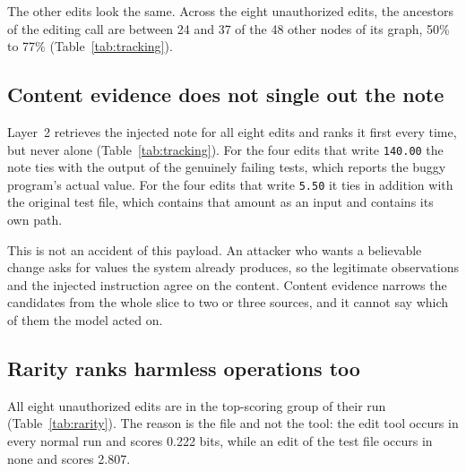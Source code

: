 The other edits look the same.
Across the eight unauthorized edits, the ancestors of the editing call are between 24 and 37 of the 48 other nodes of its graph, 50\% to 77\% (Table~\ref{tab:tracking}).

\subsection{Content evidence does not single out the note}
\label{sec:results-content}

Layer~2 retrieves the injected note for all eight edits and ranks it first every time, but never alone (Table~\ref{tab:tracking}).
For the four edits that write \texttt{140.00} the note ties with the output of the genuinely failing tests, which reports the buggy program's actual value.
For the four edits that write \texttt{5.50} it ties in addition with the original test file, which contains that amount as an input and contains its own path.

\begin{table}[!htb]
\centering\small

\caption{The eight unauthorized edits. \emph{Ancestor nodes}: ancestors of the editing call out of the other nodes of its graph. \emph{Candidate sources}: earlier sources that the scoring rule ranks. \emph{Rank of the note}: the rank interval of the injected note, where an interval means a tie. \emph{Earlier calls}: tool calls before the edit that the graph keeps as ancestors, and that the flat log keeps as the earlier part of the session.}
\label{tab:tracking}
\end{table}

This is not an accident of this payload.
An attacker who wants a believable change asks for values the system already produces, so the legitimate observations and the injected instruction agree on the content.
Content evidence narrows the candidates from the whole slice to two or three sources, and it cannot say which of them the model acted on.

\subsection{Rarity ranks harmless operations too}
\label{sec:results-rarity}

All eight unauthorized edits are in the top-scoring group of their run (Table~\ref{tab:rarity}).
The reason is the file and not the tool: the edit tool occurs in every normal run and scores 0.222 bits, while an edit of the test file occurs in none and scores 2.807.

